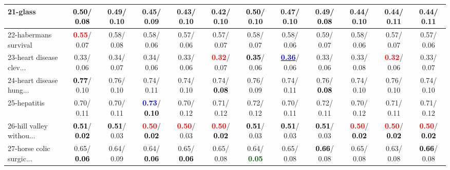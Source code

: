 \begin{table}[h]
\begin{center}
{\begin{tabular}{lc|c|c|c|c|c|c|c|c|c|c}
21-glass & \textcolor{black}{\textbf{  0.50}}/\textcolor{black}{\textbf{  0.08}} &   0.49/  0.10 &   0.45/  0.09 &   0.43/  0.10 &   0.42/  0.10 & \textcolor{black}{\textbf{  0.50}}/  0.10 &   0.47/  0.10 &   0.49/\textcolor{black}{\textbf{  0.08}} &   0.44/  0.10 &   0.44/  0.11 &   0.44/  0.11 \\ \hline
22-habermans survival & \textcolor{red}{\textbf{  0.55}}/  0.07 &   0.58/  0.08 &   0.58/  0.06 &   0.57/  0.06 &   0.57/  0.07 &   0.58/  0.07 &   0.58/  0.06 &   0.59/  0.07 &   0.58/  0.06 &   0.57/  0.07 &   0.57/  0.06 \\
23-heart disease clev... &   0.33/  0.06 &   0.34/  0.07 &   0.34/  0.06 &   0.33/  0.06 & \textcolor{red}{\textbf{  0.32}}/  0.07 & \textcolor{black}{\textbf{  0.35}}/  0.06 & \underline{\textcolor{blue}{\textbf{  0.36}}}/  0.06 &   0.33/  0.06 &   0.33/  0.08 & \textcolor{red}{\textbf{  0.32}}/  0.06 &   0.33/  0.07 \\
24-heart disease hung... & \textcolor{black}{\textbf{  0.77}}/  0.10 &   0.76/  0.10 &   0.74/  0.11 &   0.74/  0.10 &   0.74/\textcolor{black}{\textbf{  0.08}} &   0.76/  0.09 &   0.74/  0.11 &   0.76/\textcolor{black}{\textbf{  0.08}} &   0.74/  0.10 &   0.76/  0.10 &   0.74/  0.10 \\
25-hepatitis &   0.70/  0.11 &   0.70/  0.11 & \textcolor{blue}{\textbf{  0.73}}/\textcolor{black}{\textbf{  0.10}} &   0.70/  0.12 &   0.71/  0.12 &   0.72/  0.12 &   0.70/  0.11 &   0.72/  0.11 &   0.70/  0.12 &   0.71/  0.11 &   0.71/  0.12 \\
26-hill valley withou... & \textcolor{black}{\textbf{  0.51}}/\textcolor{black}{\textbf{  0.02}} & \textcolor{black}{\textbf{  0.51}}/  0.03 & \textcolor{red}{\textbf{  0.50}}/\textcolor{black}{\textbf{  0.02}} & \textcolor{red}{\textbf{  0.50}}/  0.03 & \textcolor{red}{\textbf{  0.50}}/\textcolor{black}{\textbf{  0.02}} & \textcolor{black}{\textbf{  0.51}}/  0.03 & \textcolor{black}{\textbf{  0.51}}/  0.03 & \textcolor{black}{\textbf{  0.51}}/  0.03 & \textcolor{red}{\textbf{  0.50}}/\textcolor{black}{\textbf{  0.02}} & \textcolor{red}{\textbf{  0.50}}/\textcolor{black}{\textbf{  0.02}} & \textcolor{red}{\textbf{  0.50}}/\textcolor{black}{\textbf{  0.02}} \\
27-horse colic surgic... &   0.65/\textcolor{black}{\textbf{  0.06}} &   0.64/  0.09 &   0.64/\textcolor{black}{\textbf{  0.06}} &   0.65/\textcolor{black}{\textbf{  0.06}} &   0.65/  0.08 &   0.64/\textcolor{darkgreen}{\textbf{  0.05}} &   0.65/  0.08 & \textcolor{black}{\textbf{  0.66}}/  0.08 &   0.65/  0.08 &   0.63/  0.08 & \textcolor{black}{\textbf{  0.66}}/  0.08 \\

\end{tabular}}
\end{center}
\end{table}
